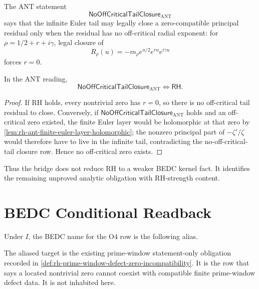 \begin{definition}
\label{def:rh-ant-no-off-critical-tail-closure}
The ANT statement
$$
\mathsf{NoOffCriticalTailClosure}_{\mathrm{ANT}}
$$
says that the infinite Euler tail may legally close a zero-compatible
principal residual only when the residual has no off-critical radial exponent:
for $\rho=1/2+r+i\gamma$, legal closure of
$$
R_{\rho}(u)=-m_{\rho}e^{u/2}e^{ru}e^{i\gamma u}
$$
forces $r=0$.
\end{definition}

\begin{theorem}
\label{thm:rh-ant-no-off-critical-tail-closure-equivalence}
In the ANT reading,
$$
\mathsf{NoOffCriticalTailClosure}_{\mathrm{ANT}}
\Longleftrightarrow
\mathsf{RH}.
$$
\end{theorem}

\begin{proof}
If RH holds, every nontrivial zero has $r=0$, so there is no off-critical
tail residual to close. Conversely, if
$\mathsf{NoOffCriticalTailClosure}_{\mathrm{ANT}}$ holds and an off-critical
zero existed, the finite Euler layer would be holomorphic at that zero by
\autoref{lem:rh-ant-finite-euler-layer-holomorphic}; the nonzero principal
part of $-\zeta'/\zeta$ would therefore have to live in the infinite tail,
contradicting the no-off-critical-tail closure row. Hence no off-critical
zero exists.
\end{proof}

Thus the bridge does not reduce RH to a weaker BEDC kernel fact. It identifies
the remaining unproved analytic obligation with RH-strength content.

\section{BEDC Conditional Readback}
\label{sec:rh-bedc-ant-bedc-readback}

Under $I$, the BEDC name for the O4 row is the following alias.

The aliased target is the existing prime-window statement-only obligation
recorded in \autoref{def:rh-prime-window-defect-zero-incompatibility}. It is
the row that says a located nontrivial zero cannot coexist with compatible
finite prime-window defect data. It is not inhabited here.

